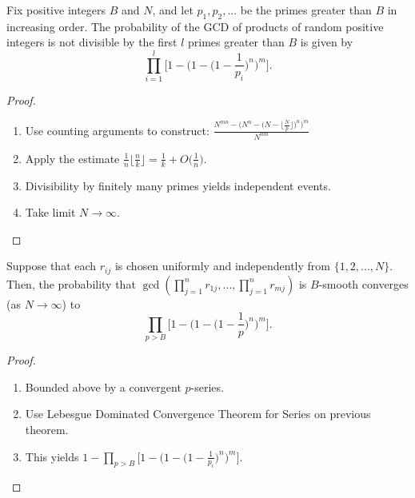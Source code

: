\documentclass[11pt,xcolor={dvipsnames}]{beamer}
\begin{document}
	\begin{frame}
		\begin{theorem}
			Fix positive integers $B$ and $N$, and let $p_1, p_2, ...$ be the primes greater than $B$ in increasing order. The probability of the GCD of products of random positive integers is not divisible by the first $l$ primes greater than $B$ is given by
			$$\prod_{i=1}^{l} \Big[1 - \Big(1 - \Big(1-\frac{1}{p_i}\Big)^n\Big)^m\Big].$$
		\end{theorem}
			\begin{proof}
		\begin{enumerate}
			\item Use counting arguments to construct:
			$\frac{N^{mn} - \Big(N^n - \Big(N - \Big\lfloor\frac{N}{p}\Big\rfloor\Big)^n\Big)^m}{N^{mn}}$
			\item Apply the estimate $\frac{1}{n} \Big\lfloor \frac{n}{k} \Big\rfloor = \frac{1}{k} + O\Big(\frac{1}{n}\Big)$.
			\item Divisibility by finitely many primes yields independent events.
			\item Take limit $N \to \infty$. 
		\end{enumerate}
		\end{proof}
	\end{frame}

	\begin{frame}
		\begin{theorem}
			Suppose that each $r_{ij}$ is chosen uniformly and independently from $\{1, 2, ..., N\}$. Then, the probability that $\gcd(\prod_{j=1}^n r_{1j}, ... , \prod_{j=1}^n r_{mj})$ is $B$-smooth converges (as $N \to \infty$) to
			$$\prod_{p>B} \Big[1 - \Big(1 - \Big(1 - \frac{1}{p}\Big)^n \Big)^m \Big].$$
		\end{theorem}
		\begin{proof}
			\begin{enumerate}
				\item Bounded above by a convergent $p$-series.
                \item Use Lebesgue Dominated Convergence Theorem for Series on previous theorem.
				\item This yields $ 1 - \prod_{p > B} \Big[1 - \Big(1 - \Big(1 - \frac{1}{p_i}  \Big)^n\Big)^m\Big].$
			\end{enumerate}
		\end{proof}
	\end{frame}
\end{document}

